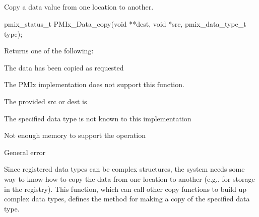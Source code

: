 \subsection{}

\summary

Copy a data value from one location to another.

\format

\begin{signature}{2.0}
pmix_status_t
PMIx_Data_copy(void **dest, void *src,
\hspace*{15\sigspace}pmix_data_type_t type);
\end{signature}

\begin{arglist}
\end{arglist}

Returns one of the following:
\begin{constantdesc}
\item {} The data has been copied as requested
\item {} The \ac{PMIx} implementation does not support this function.
\item {} The provided src or dest is 
\item {} The specified data type is not known to this implementation
\item {} Not enough memory to support the operation
\item {} General error
\end{constantdesc}

\descr

Since registered data types can be complex structures, the system needs some way to know how to copy the data from one location to another (e.g., for storage in the registry). This function, which can call other copy functions to build up complex data types, defines the method for making a copy of the specified data type.


\subsection{}


